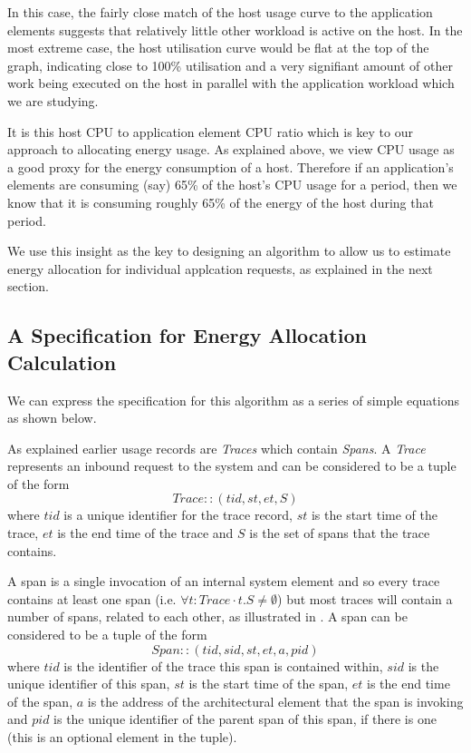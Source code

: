 In this case, the fairly close match of the host usage curve to the application elements suggests that relatively little other workload is active on the host.  In the most extreme case, the host utilisation curve would be flat at the top of the graph, indicating close to 100\% utilisation and a very signifiant amount of other work being executed on the host in parallel with the application workload which we are studying.

It is this host CPU to application element CPU ratio which is key to our approach to allocating energy usage.  As explained above, we view CPU usage as a good proxy for the energy consumption of a host.  Therefore if an application's elements are consuming (say) 65\% of the host's CPU usage for a period, then we know that it is consuming roughly 65\% of the energy of the host during that period.

We use this insight as the key to designing an algorithm to allow us to estimate energy allocation for individual applcation requests, as explained in the next section.


\subsection{A Specification for Energy Allocation Calculation}
\label{subsection:calculation-specification}


We can express the specification for this algorithm as a series of simple equations as shown below.

As explained earlier usage records are \emph{Traces} which contain \emph{Spans}.  A \emph{Trace} represents an inbound request to the system and can be considered to be a tuple of the form 
\begin{equation}
Trace :: (tid, st, et, S)
\end{equation}
where $tid$ is a unique identifier for the trace record, $st$ is the start time of the trace, $et$ is the end time of the trace and $S$ is the set of spans that the trace contains.  

A span is a single invocation of an internal system element and so every trace contains at least one span (i.e. $\forall t : Trace \cdot t.S \neq \emptyset$) but most traces will contain a number of spans, related to each other, as illustrated in .  A span can be considered to be a tuple of the form
\begin{equation}
Span :: (tid, sid, st, et, a, pid)
\end{equation}
where $tid$ is the identifier of the trace this span is contained within, $sid$ is the unique identifier of this span, $st$ is the start time of the span, $et$ is the end time of the span, $a$ is the address of the architectural element that the span is invoking and $pid$ is the unique identifier of the parent span of this span, if there is one (this is an optional element in the tuple).

